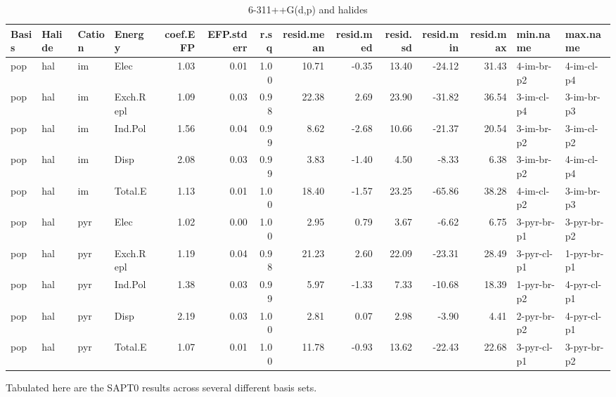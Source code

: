 \documentclass[a4paper]{article}
\begin{document}
\begin{landscape}
\begin{table}[ht]
\centering
\begin{tabular}{llllrrrrrrrrll}
  \hline
Basis & Halide & Cation & Energy & coef.EFP & EFP.stderr & r.sq & resid.mean & resid.med & resid.sd & resid.min & resid.max & min.name & max.name \\ 
  \hline
pop & hal & im & Elec & 1.03 & 0.01 & 1.00 & 10.71 & -0.35 & 13.40 & -24.12 & 31.43 & 4-im-br-p2 & 4-im-cl-p4 \\ 
  pop & hal & im & Exch.Repl & 1.09 & 0.03 & 0.98 & 22.38 & 2.69 & 23.90 & -31.82 & 36.54 & 3-im-cl-p4 & 3-im-br-p3 \\ 
  pop & hal & im & Ind.Pol & 1.56 & 0.04 & 0.99 & 8.62 & -2.68 & 10.66 & -21.37 & 20.54 & 3-im-br-p2 & 3-im-cl-p2 \\ 
  pop & hal & im & Disp & 2.08 & 0.03 & 0.99 & 3.83 & -1.40 & 4.50 & -8.33 & 6.38 & 3-im-br-p2 & 4-im-cl-p4 \\ 
  pop & hal & im & Total.E & 1.13 & 0.01 & 1.00 & 18.40 & -1.57 & 23.25 & -65.86 & 38.28 & 4-im-cl-p2 & 3-im-br-p3 \\ 
  pop & hal & pyr & Elec & 1.02 & 0.00 & 1.00 & 2.95 & 0.79 & 3.67 & -6.62 & 6.75 & 3-pyr-br-p1 & 3-pyr-br-p2 \\ 
  pop & hal & pyr & Exch.Repl & 1.19 & 0.04 & 0.98 & 21.23 & 2.60 & 22.09 & -23.31 & 28.49 & 3-pyr-cl-p1 & 1-pyr-br-p1 \\ 
  pop & hal & pyr & Ind.Pol & 1.38 & 0.03 & 0.99 & 5.97 & -1.33 & 7.33 & -10.68 & 18.39 & 1-pyr-br-p2 & 4-pyr-cl-p1 \\ 
  pop & hal & pyr & Disp & 2.19 & 0.03 & 1.00 & 2.81 & 0.07 & 2.98 & -3.90 & 4.41 & 2-pyr-br-p2 & 4-pyr-cl-p1 \\ 
  pop & hal & pyr & Total.E & 1.07 & 0.01 & 1.00 & 11.78 & -0.93 & 13.62 & -22.43 & 22.68 & 3-pyr-cl-p1 & 3-pyr-br-p2 \\ 
   \hline
\end{tabular}
\caption{6-311++G(d,p) and halides}
\end{table}


\end{landscape}

Tabulated here are the SAPT0 results across several different basis sets.
\end{document}
